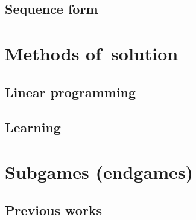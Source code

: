 \subsection{Sequence form}

\section{Methods of~solution}

\subsection{Linear programming}

\subsection{Learning}

\section{Subgames (endgames)}

\subsection{Previous works}
